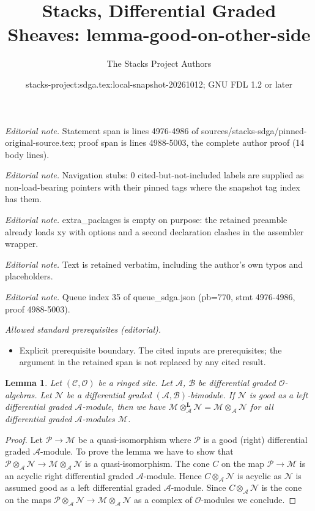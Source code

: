 \documentclass[10pt,a4paper]{amsart}
\title{Stacks, Differential Graded Sheaves: lemma-good-on-other-side}
\author{The Stacks Project Authors}
\date{stacks-project:sdga.tex:local-snapshot-20261012; GNU FDL 1.2 or later}
\theoremstyle{plain}
\newtheorem{lemma}[subsection]{Lemma}
\theoremstyle{definition}
\theoremstyle{remark}
\numberwithin{equation}{subsection}
\begin{document}
\maketitle
\noindent\textit{Editorial note.} Statement span is lines 4976-4986 of sources/stacks-sdga/pinned-original-source.tex; proof span is lines 4988-5003, the complete author proof (14 body lines).\par\medskip
\noindent\textit{Editorial note.} Navigation stubs: 0 cited-but-not-included labels are supplied as non-load-bearing pointers with their pinned tags where the snapshot tag index has them.\par\medskip
\noindent\textit{Editorial note.} extra\_packages is empty on purpose: the retained preamble already loads xy with options and a second declaration clashes in the assembler wrapper.\par\medskip
\noindent\textit{Editorial note.} Text is retained verbatim, including the author's own typos and placeholders.\par\medskip
\noindent\textit{Editorial note.} Queue index 35 of queue\_sdga.json (pb=770, stmt 4976-4986, proof 4988-5003).\par\medskip
\noindent\textit{Allowed standard prerequisites (editorial).}\begin{itemize}
\item Explicit prerequisite boundary. The cited inputs are prerequisites; the argument in the retained span is not replaced by any cited result.
\end{itemize}\medskip
\begin{lemma}
\label{lemma-good-on-other-side}
Let $(\mathcal{C}, \mathcal{O})$ be a ringed site. Let
$\mathcal{A}$, $\mathcal{B}$ be differential graded $\mathcal{O}$-algebras.
Let $\mathcal{N}$ be a  differential graded
$(\mathcal{A}, \mathcal{B})$-bimodule. If $\mathcal{N}$ is good
as a left differential graded $\mathcal{A}$-module, then
we have $\mathcal{M} \otimes_\mathcal{A}^\mathbf{L} \mathcal{N} =
\mathcal{M} \otimes_\mathcal{A} \mathcal{N}$ for all
differential graded $\mathcal{A}$-modules $\mathcal{M}$.
\end{lemma}

\begin{proof}
Let $\mathcal{P} \to \mathcal{M}$ be a quasi-isomorphism where
$\mathcal{P}$ is a good (right) differential graded $\mathcal{A}$-module.
To prove the lemma we have to show that
$\mathcal{P} \otimes_\mathcal{A} \mathcal{N} \to
\mathcal{M} \otimes_\mathcal{A} \mathcal{N}$
is a quasi-isomorphism. The cone $C$ on the map
$\mathcal{P} \to \mathcal{M}$ is an acyclic right differential
graded $\mathcal{A}$-module. Hence
$C \otimes_\mathcal{A} \mathcal{N}$ is acyclic as $\mathcal{N}$
is assumed good as a left differential graded $\mathcal{A}$-module.
Since $C \otimes_\mathcal{A} \mathcal{N}$ is the cone on the
maps $\mathcal{P} \otimes_\mathcal{A} \mathcal{N} \to
\mathcal{M} \otimes_\mathcal{A} \mathcal{N}$ as a complex
of $\mathcal{O}$-modules we conclude.
\end{proof}
\end{document}
